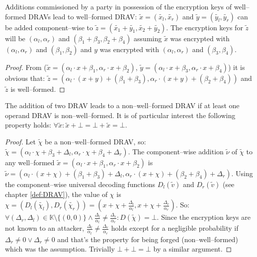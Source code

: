 \begin{lem}
  \label{lem:DRAV-add}

Additions commissioned by a party in possession of the encryption keys of
well--formed DRAVs lead to well--formed DRAV: $\widetilde{x} =
(\widetilde{x_l}, \widetilde{x_r})$ and $\widetilde{y} = (\widetilde{y_l},
\widetilde{y_r})$ can be added component--wise to $\widetilde{z} =
\left(\widetilde{x_1} + \widetilde{y_1}, \widetilde{x_2} +
\widetilde{y_2}\right)$. The encryption keys for $\widetilde{z}$ will be
$(\alpha_l, \alpha_r)$ and $(\beta_1 + \beta_3, \beta_2 + \beta_4)$ assuming
$\widetilde{x}$ was encrypted with $(\alpha_l, \alpha_r)$ and $(\beta_1,
\beta_2)$ and $y$ was encrypted with $(\alpha_l, \alpha_r)$ and $(\beta_3,
\beta_4)$.

\end{lem}
\begin{proof}

From ($\widetilde{x} = \left(\alpha_l \cdot x + \beta_1,
\alpha_r \cdot x + \beta_2\right)$, $\widetilde{y} = \left(\alpha_l \cdot x +
\beta_3, \alpha_r \cdot x + \beta_4\right)$) it is obvious that: $\widetilde{z}
= \left(\alpha_l \cdot (x+y) + (\beta_1 + \beta_3), \alpha_r \cdot (x+y) +
(\beta_2 + \beta_4)\right)$ and $\widetilde{z}$ is well--formed.

\end{proof}

\begin{lem}
  \label{lem:DRAV-add-bad}

The addition of two DRAV leads to a non--well--formed DRAV if at least one
operand DRAV is non--well--formed. It is of particular interest the following
property holds: $\forall \widetilde{x}: \widetilde{x} + \bot = \bot +
\widetilde{x} = \bot$.

\end{lem}
\begin{proof}

Let $\widetilde{\chi}$ be a non--well--formed DRAV, so: $\widetilde{\chi} =
(\alpha_l \cdot \chi + \beta_3 + \Delta_l, \alpha_r \cdot \chi + \beta_4 +
\Delta_r)$. The component--wise addition $\widetilde{\nu}$ of $\widetilde{\chi}$
to any well--formed $\widetilde{x} = (\alpha_l \cdot x + \beta_1, \alpha_r \cdot
x + \beta_2)$ is $\widetilde{\nu} = (\alpha_l \cdot (x+\chi) + (\beta_1+\beta_3)
+ \Delta_l, \alpha_r \cdot (x+\chi) + (\beta_2+\beta_4) + \Delta_r)$.  Using the
component--wise universal decoding functions $D_l(\widetilde{v})$ and
$D_r(\widetilde{v})$ (see chapter \ref{def:DRAV}), the value of $\chi$ is $\chi
= (D_l(\widetilde{\chi_l}), D_r(\widetilde{\chi_r})) = (x + \chi +
\frac{\Delta_l}{\alpha_l}, x + \chi + \frac{\Delta_r}{\alpha_r})$. So: $\forall
(\Delta_r, \Delta_l) \in \mathbb{K} \setminus \{(0, 0)\} \wedge
\frac{\Delta_l}{\alpha_l} \neq \frac{\Delta_r}{\alpha_r}: D(\widetilde{\chi}) =
\bot$. Since the encryption keys are not known to an attacker,
$\frac{\Delta_l}{\alpha_l} \neq \frac{\Delta_r}{\alpha_r}$ holds except for a
negligible probability if $\Delta_r \neq 0 \vee \Delta_r \neq 0$ and that's the
property for being forged (non--well--formed) which was the assumption.
Trivially $\bot + \bot = \bot$ by a similar argument.

\end{proof}


